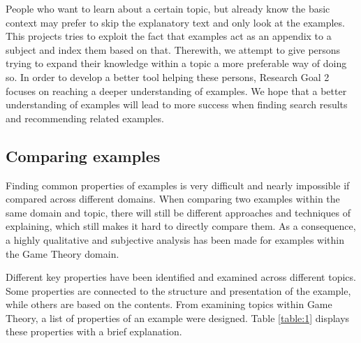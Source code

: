 People who want to learn about a certain topic, but already know the basic context may prefer to skip the explanatory text and only look at the examples. This projects tries to exploit the fact that examples act as an appendix to a subject and index them based on that. Therewith, we attempt to give persons trying to expand their knowledge within a topic a more preferable way of doing so. In order to develop a better tool helping these persons, Research Goal 2 focuses on reaching a deeper understanding of examples. We hope that a better understanding of examples will lead to more success when finding search results and recommending related examples.

\subsection{Comparing examples} \label{comparing_examples}

Finding common properties of examples is very difficult and nearly impossible if  compared across different domains. When comparing two examples within the same domain and topic, there will still be different approaches and techniques of explaining, which still makes it hard to directly compare them. As a consequence, a highly qualitative and subjective analysis has been made for examples within the Game Theory domain. 

Different key properties have been identified and examined across different topics. Some properties are connected to the structure and presentation of the example, while others are based on the contents. From examining topics within Game Theory, a list of properties of an example were designed. Table \ref{table:1} displays these properties with a brief explanation.

